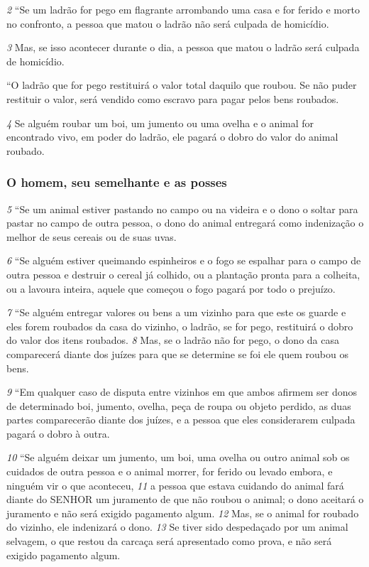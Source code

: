 \smallskip
\textit{\tiny 2} 
“Se um ladrão for pego em flagrante arrombando uma casa e for ferido e
morto no confronto, a pessoa que matou o ladrão não será culpada de homicídio. 

\smallskip
\textit{\tiny 3} 
Mas, se isso acontecer durante o dia, a pessoa que matou o ladrão será culpada
de homicídio.

\smallskip
   “O ladrão que for pego restituirá o valor total daquilo que roubou. Se não puder
restituir o valor, será vendido como escravo para pagar pelos bens roubados. 

\smallskip
\textit{\tiny 4} 
Se alguém roubar um boi, um jumento ou uma ovelha e o animal for encontrado
vivo, em poder do ladrão, ele pagará o dobro do valor do animal roubado. 

\bigskip
\subsubsection*{O homem, seu semelhante e as posses}
\textit{\tiny 5} 
“Se um animal estiver pastando no campo ou na videira e o dono o soltar para
pastar no campo de outra pessoa, o dono do animal entregará como indenização o
melhor de seus cereais ou de suas uvas. 

\smallskip
\textit{\tiny 6} 
“Se alguém estiver queimando espinheiros e o fogo se espalhar para o campo
de outra pessoa e destruir o cereal já colhido, ou a plantação pronta para a
colheita, ou a lavoura inteira, aquele que começou o fogo pagará por todo o
prejuízo. 

\smallskip
\textit{\tiny 7} 
“Se alguém entregar valores ou bens a um vizinho para que este os guarde e
eles forem roubados da casa do vizinho, o ladrão, se for pego, restituirá o dobro
do valor dos itens roubados. 
\textit{\tiny 8} 
Mas, se o ladrão não for pego, o dono da casa
comparecerá diante dos juízes para que se determine se foi ele quem roubou os
bens. 

\smallskip
\textit{\tiny 9} 
“Em qualquer caso de disputa entre vizinhos em que ambos afirmem ser
donos de determinado boi, jumento, ovelha, peça de roupa ou objeto perdido, as
duas partes comparecerão diante dos juízes, e a pessoa que eles considerarem
culpada pagará o dobro à outra.
   
\smallskip
\textit{\tiny 10}
“Se alguém deixar um jumento, um boi, uma ovelha ou outro animal sob os
cuidados de outra pessoa e o animal morrer, for ferido ou levado embora, e
ninguém vir o que aconteceu, 
\textit{\tiny 11}
a pessoa que estava cuidando do animal fará
diante do SENHOR um juramento de que não roubou o animal; o dono aceitará o
juramento e não será exigido pagamento algum. 
\textit{\tiny 12}
Mas, se o animal for roubado
do vizinho, ele indenizará o dono. 
\textit{\tiny 13}
Se tiver sido despedaçado por um animal
selvagem, o que restou da carcaça será apresentado como prova, e não será
exigido pagamento algum.
   
